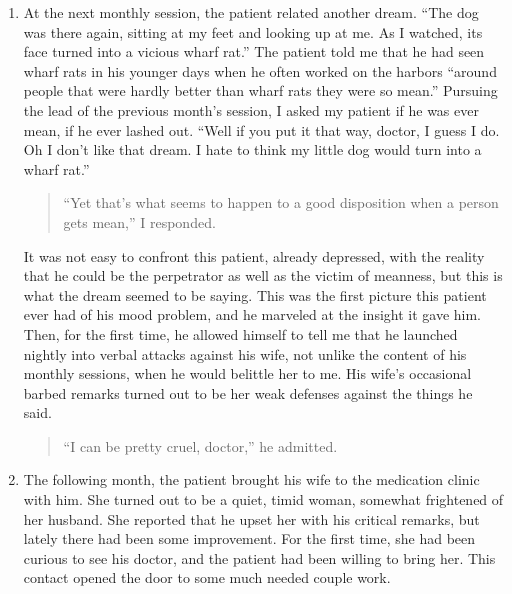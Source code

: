 \begin{enumerate}
\begin{quote} Why, yes. Last night I had a dream about my little dog. I was
holding him up in my arms, and he was looking up at me every so tenderly, when
suddenly he seemed to droop his head like he was going to die. \end{quote}

I asked the patient to tell me about his dog. It turned out that he loved his
pet above all other things because the dog was always sweet and cheerful. I
then asked the man if this dog might not be his own cheerful disposition, which
had faded into despondence after his wife's sarcastic remark. My patient seemed
to like this idea.

\item {} At
the next monthly session, the patient related another dream. ``The dog was
there again, sitting at my feet and looking up at me. As I watched, its face
turned into a vicious wharf rat.'' The patient told me that he had seen wharf
rats in his younger days when he often worked on the harbors ``around people
that were hardly better than wharf rats they were so mean.'' Pursuing the lead
of the previous month's session, I asked my patient if he was ever mean, if he
ever lashed out. ``Well if you put it that way, doctor, I guess I do. Oh I
don't like that dream. I hate to think my little dog would turn into a wharf
rat.''

\begin{quote} ``Yet that's what seems to happen to a good disposition when a
person gets mean,'' I responded. \end{quote}

It was not easy to confront this patient, already depressed, with the reality
that he could be the perpetrator as well as the victim of meanness, but this is
what the dream seemed to be saying. This was the first picture this patient
ever had of his mood problem, and he marveled at the insight it gave him. Then,
for the first time, he allowed himself to tell me that he launched nightly into
verbal attacks against his wife, not unlike the content of his monthly
sessions, when he would belittle her to me. His wife's occasional barbed
remarks turned out to be her weak defenses against the things he said.

\begin{quote}``I can be pretty cruel, doctor,'' he admitted. \end{quote}

\item {} The following month, the
patient brought his wife to the medication clinic with him. She turned out to
be a quiet, timid woman, somewhat frightened of her husband. She reported that
he upset her with his critical remarks, but lately there had been some
improvement. For the first time, she had been curious to see his doctor, and
the patient had been willing to bring her. This contact opened the door to some
much needed couple work.

\end{enumerate}

